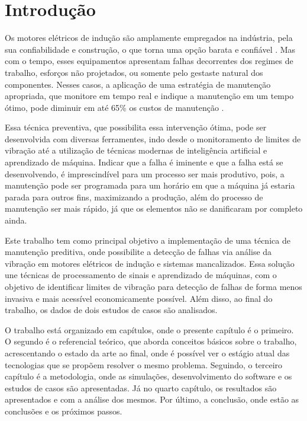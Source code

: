 
\chapter[Introdução]{Introdução}

Os motores elétricos de indução são amplamente empregados na indústria, pela sua confiabilidade e construção, o que torna uma opção 
barata e confiável \cite{Umans2003}. Mas com o tempo, esses equipamentos apresentam falhas decorrentes dos regimes de trabalho, esforços não 
projetados, ou somente pelo gestaste natural dos componentes. Nesses casos, a aplicação de uma estratégia de manutenção apropriada, que
monitore em tempo real e indique a manutenção em um tempo ótimo, pode diminuir em até 65\% os custos de manutenção \cite{Wu2013}. 

Essa técnica preventiva, que possibilita essa intervenção ótima, pode ser desenvolvida com diversas ferramentes, indo desde o monitoramento
de limites de vibração até a utilização de técnicas modernas de inteligência artificial e aprendizado de máquina. Indicar que a falha é
iminente e que a falha está se desenvolvendo, é imprescindível para um processo ser mais produtivo, pois, a manutenção pode ser programada
para um horário em que a máquina já estaria parada para outros fins, maximizando a produção, além do processo de manutenção ser mais rápido, 
já que os elementos não se danificaram por completo ainda.

Este trabalho tem como principal objetivo a implementação de uma técnica de manutenção preditiva, onde possibilite a detecção
de falhas via análise da vibração em motores elétricos de indução e sistemas mancalizados. Essa solução une técnicas de processamento de 
sinais e aprendizado de máquinas, com o objetivo de identificar limites de vibração para detecção de falhas de forma menos invasiva e mais 
acessível economicamente possível. Além disso, ao final do trabalho, os dados de dois estudos de casos são analisados.

O trabalho está organizado em capítulos, onde o presente capítulo é o primeiro. O segundo é o referencial teórico, que aborda conceitos
básicos sobre o trabalho, acrescentando o estado da arte ao final, onde é possível ver o estágio atual das tecnologias que se propõem 
resolver o mesmo problema. Seguindo, o terceiro capítulo é a metodologia, onde as simulações, desenvolvimento do software e os estudos de
casos são apresentadas. Já no quarto capítulo, os resultados são apresentados e com a análise dos mesmos. Por último, a 
conclusão, onde estão as conclusões e os próximos passos.




